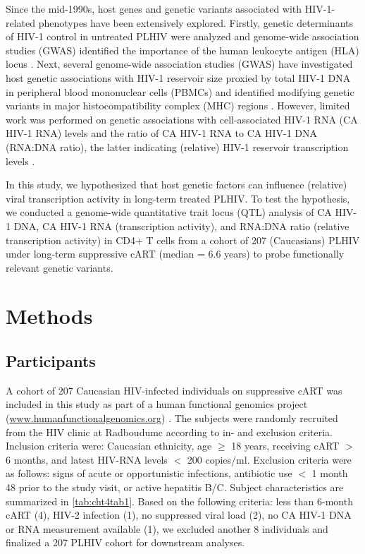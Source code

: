 \documentclass{book}
\begin{document}
\begin{refsection}
Since the mid-1990s, host genes and genetic variants associated with HIV-1-related phenotypes have been extensively explored.
Firstly, genetic determinants of HIV-1 control in untreated PLHIV were analyzed and genome-wide association studies (GWAS) identified the importance of the human leukocyte antigen (HLA) locus \cite{Kulkarni2011Differential,Thomas2009HLA,Herráiz2017Impact,Limou2009Genomewide,Fellay2009Common}.
Next, several genome-wide association studies (GWAS) have investigated host genetic associations with HIV-1 reservoir size proxied by total HIV-1 DNA in peripheral blood mononuclear cells (PBMCs) and identified modifying genetic variants in major histocompatibility complex (MHC) regions \cite{Thorball2020Host,Dalmasso2008Distinct}.
However, limited work was performed on genetic associations with cell-associated HIV-1 RNA (CA HIV-1 RNA) levels and the ratio of CA HIV-1 RNA to CA HIV-1 DNA (RNA:DNA ratio), the latter indicating (relative) HIV-1 reservoir transcription levels \cite{Pasternak2018What}.

In this study, we hypothesized that host genetic factors can influence (relative) viral transcription activity in long-term treated PLHIV.
To test the hypothesis, we conducted a genome-wide quantitative trait locus (QTL) analysis of CA HIV-1 DNA, CA HIV-1 RNA (transcription activity), and RNA:DNA ratio (relative transcription activity) in CD4+ T cells from a cohort of 207 (Caucasians) PLHIV under long-term suppressive cART (median = 6.6 years) to probe functionally relevant genetic variants.

\section*{Methods}
\subsection*{Participants}
A cohort of 207 Caucasian HIV-infected individuals on suppressive cART was included in this study as part of a human functional genomics project (\url{www.humanfunctionalgenomics.org}) \cite{Pappalardo2016The}.
The subjects were randomly recruited from the HIV clinic at Radboudumc according to in- and exclusion criteria.
Inclusion criteria were: Caucasian ethnicity, age $\ge$ 18 years, receiving cART $>$ 6 months, and latest HIV-RNA levels $<$ 200 copies/ml.
Exclusion criteria were as follows: signs of acute or opportunistic infections, antibiotic use $<$ 1 month 48 prior to the study visit, or active hepatitis B/C.
Subject characteristics are summarized in \ref{tab:cht4tab1}.
Based on the following criteria: less than 6-month cART (4), HIV-2 infection (1), no suppressed viral load (2), no CA HIV-1 DNA or RNA measurement available (1), we excluded another 8 individuals and finalized a 207 PLHIV cohort for downstream analyses.


\end{refsection}
\end{document}
